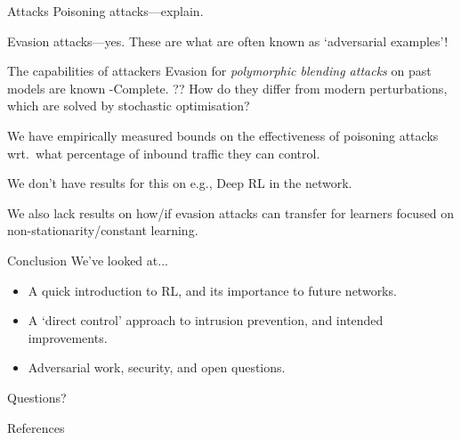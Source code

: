 \documentclass[aspectratio=169,xcolor={dvipsnames}
,hide notes
]{beamer}
\begin{document}
\begin{frame}{Attacks}
	Poisoning attacks---explain.
	
	Evasion attacks---yes. These are what are often known as `adversarial examples'!
\end{frame}

\begin{frame}{The capabilities of attackers}
	Evasion for \emph{polymorphic blending attacks} on past models are known \NP-Complete. ?? How do they differ from modern perturbations, which are solved by stochastic optimisation?
	
	We have empirically measured bounds on the effectiveness of poisoning attacks wrt.\ what percentage of inbound traffic they can control.
	
	We don't have results for this on e.g., Deep RL in the network.
	
	We also lack results on how/if evasion attacks can transfer for learners focused on non-stationarity/constant learning.
\end{frame}

\begin{frame}[standout]{Conclusion}
	We've looked at...
	\begin{itemize}
		\item A quick introduction to RL, and its \alert{importance to future networks}.
		\item A `direct control' approach to intrusion prevention, and \alert{intended improvements}.
		\item Adversarial work, security, and open questions.
	\end{itemize}
	
	\alert{Questions?}
\end{frame}

\appendix

\begin{frame}[allowframebreaks]{References}
\printbibliography[heading=none]
\end{frame}
\end{document}
